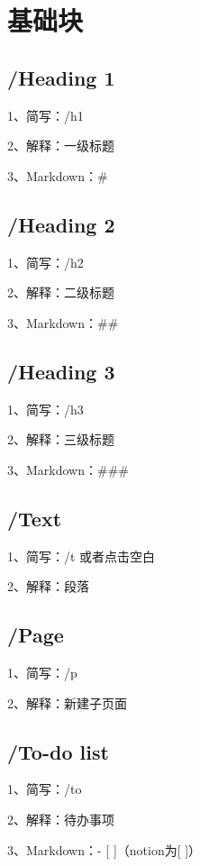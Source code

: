 \chapter{基础块}

\section{/Heading 1}

1、简写：/h1

2、解释：一级标题

3、Markdown：\# 

\section{/Heading 2}

1、简写：/h2

2、解释：二级标题

3、Markdown：\#\# 

\section{/Heading 3}

1、简写：/h3

2、解释：三级标题

3、Markdown：\#\#\# 

\section{/Text}

1、简写：/t 或者点击空白

2、解释：段落

\section{/Page}

1、简写：/p

2、解释：新建子页面

\section{/To-do list}

1、简写：/to

2、解释：待办事项

3、Markdown：- [ ]（notion为[ ]）


